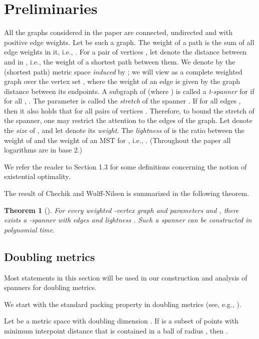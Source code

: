 \documentclass[11pt,letterpaper]{article}
\newtheorem{theorem}{Theorem}
\begin{document}
\section{Preliminaries}\label{sec:pre}
All the graphs considered in the paper are connected, undirected and with positive edge weights. Let  be such a graph.
The weight  of a path  is the sum of all edge weights in it, i.e., .
For a pair of vertices , let  denote the distance between  and  in , i.e., the weight of a shortest path between them.
We denote by  the (shortest path) metric space \emph{induced} by ; we will view  as a complete weighted graph  over the vertex set ,
where the weight  of an edge  is given by the graph distance  between its endpoints.
A subgraph  of  (where ) is called a \emph{t-spanner} for  if for all ,  .
The parameter  is called the \emph{stretch} of the spanner .
If  for all edges , then
it also holds that  for all pairs of vertices .
Therefore, to bound the stretch of the spanner, one may restrict the attention to the edges of the graph.
Let  denote the \emph{size} of , and let  denote its \emph{weight}.
The \emph{lightness}  of  is the ratio between the weight of  and the weight of an MST for , i.e., .
(Throughout the paper all logarithms are in base 2.)

We refer the reader to Section 1.3 for some definitions concerning the notion of existential optimality.



The result of  Chechik and Wulff{-}Nilsen \cite{CW18} is summarized in the following theorem.
\begin{theorem}[\cite{CW18}]\label{thm:CW18}
	For every weighted -vertex graph  and parameters  and , there exists a
	-spanner with  edges and lightness . Such a spanner can be constructed in polynomial time.
\end{theorem}	

\subsection{Doubling metrics}\label{sebsec:DoublingPreliminaries}
Most statements in this section will be used in our construction and analysis of spanners for doubling metrics. 

We start with the
standard packing property in doubling metrics (see, e.g.,  \cite{GKL03}).
\begin{lemma} \label{lem:doubling_packing}
	Let  be a metric space  with doubling dimension .
	If  is a subset of points with minimum interpoint distance 
	that is contained in a ball of radius , then
	.
\end{lemma}
\end{document}

